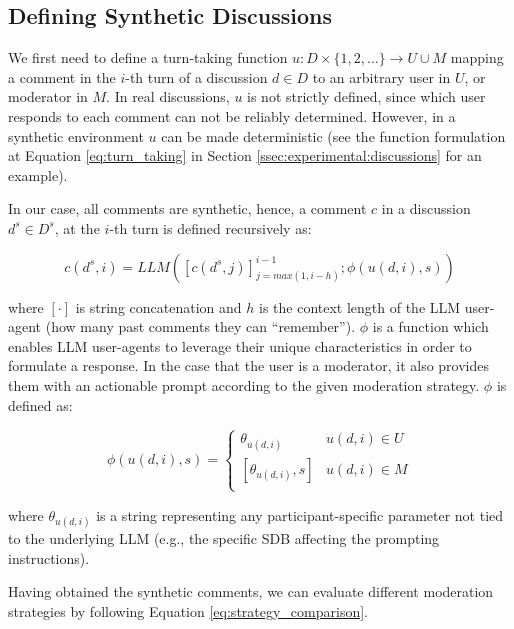 \subsection{Defining Synthetic Discussions}

We first need to define a turn-taking function $u: D  \times \{1, 2, \ldots\} \rightarrow U \cup M$ mapping a comment in the $i$-th turn of a discussion $d \in D$ to an arbitrary user in $U$, or moderator in $M$. In real discussions, $u$ is not strictly defined, since which user responds to each comment can not be reliably determined. However, in a synthetic environment $u$ can be made deterministic (see the function formulation at Equation \ref{eq:turn_taking} in Section \ref{ssec:experimental:discussions} for an example).

In our case, all comments are synthetic, hence, a comment $c$ in a discussion $d^s \in D^s$, at the $i$-th turn is defined recursively as:

\begin{equation}
    c(d^s, i) = LLM([c(d^s, j)]^{i-1}_{j=max(1, i-h)}; \phi(u(d, i), s))
\end{equation}

\noindent where $[\cdot]$ is string concatenation and $h$ is the context length of the \ac{LLM} user-agent (how many past comments they can “remember”). $\phi$ is a function which enables \ac{LLM} user-agents to leverage their unique characteristics in order to formulate a response. In the case that the user is a moderator, it also provides them with an actionable prompt according to the given moderation strategy. $\phi$ is defined as:

\begin{equation}
\label{eq:phi}
    \phi(u(d, i), s) = \left\{
\begin{array}{ll}
      \theta_{u(d, i)} & u(d, i) \in U \\
      {[\theta_{u(d, i)}, s]} & u(d, i) \in M \\ %
\end{array} 
\right. 
\end{equation}

\noindent where $\theta_{u(d, i)}$ is a string representing any participant-specific parameter not tied to the underlying \ac{LLM} (e.g., the specific \ac{SDB} affecting the prompting instructions). 

Having obtained the synthetic comments, we can evaluate different moderation strategies by following Equation \ref{eq:strategy_comparison}.